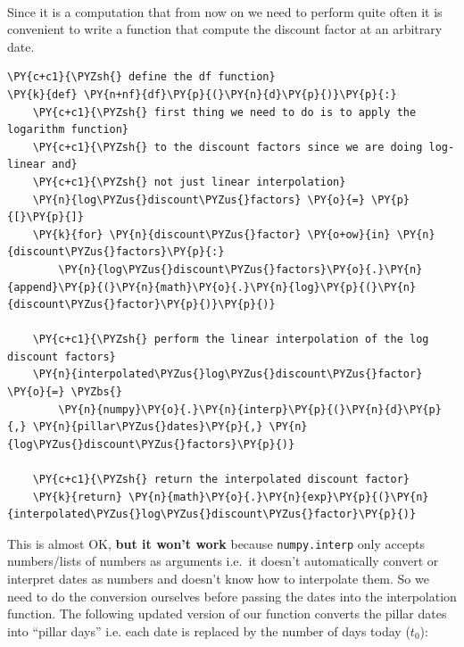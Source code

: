 \begin{center}
\end{center}
{ \hspace*{\fill} \\}
    
Since it is a computation that from now on we need to perform quite often it is convenient to write a function that compute the discount factor at an arbitrary date.

\begin{tcolorbox}[breakable, size=fbox, boxrule=1pt, pad at break*=1mm,colback=cellbackground, colframe=cellborder]
\begin{Verbatim}[commandchars=\\\{\}]
\PY{c+c1}{\PYZsh{} define the df function}
\PY{k}{def} \PY{n+nf}{df}\PY{p}{(}\PY{n}{d}\PY{p}{)}\PY{p}{:}
    \PY{c+c1}{\PYZsh{} first thing we need to do is to apply the logarithm function}
    \PY{c+c1}{\PYZsh{} to the discount factors since we are doing log-linear and}
    \PY{c+c1}{\PYZsh{} not just linear interpolation}
    \PY{n}{log\PYZus{}discount\PYZus{}factors} \PY{o}{=} \PY{p}{[}\PY{p}{]}
    \PY{k}{for} \PY{n}{discount\PYZus{}factor} \PY{o+ow}{in} \PY{n}{discount\PYZus{}factors}\PY{p}{:}
        \PY{n}{log\PYZus{}discount\PYZus{}factors}\PY{o}{.}\PY{n}{append}\PY{p}{(}\PY{n}{math}\PY{o}{.}\PY{n}{log}\PY{p}{(}\PY{n}{discount\PYZus{}factor}\PY{p}{)}\PY{p}{)}
    
    \PY{c+c1}{\PYZsh{} perform the linear interpolation of the log discount factors}
    \PY{n}{interpolated\PYZus{}log\PYZus{}discount\PYZus{}factor} \PY{o}{=} \PYZbs{}
        \PY{n}{numpy}\PY{o}{.}\PY{n}{interp}\PY{p}{(}\PY{n}{d}\PY{p}{,} \PY{n}{pillar\PYZus{}dates}\PY{p}{,} \PY{n}{log\PYZus{}discount\PYZus{}factors}\PY{p}{)}
    
    \PY{c+c1}{\PYZsh{} return the interpolated discount factor}
    \PY{k}{return} \PY{n}{math}\PY{o}{.}\PY{n}{exp}\PY{p}{(}\PY{n}{interpolated\PYZus{}log\PYZus{}discount\PYZus{}factor}\PY{p}{)}
\end{Verbatim}
\end{tcolorbox}

This is almost OK, \textbf{but it won't work} because \texttt{numpy.interp} only accepts numbers/lists of numbers as arguments i.e.~it doesn't automatically convert or interpret dates as numbers and doesn't know how to interpolate them. So we need to do the conversion ourselves before passing the dates into the interpolation function.
The following updated version of our function converts the pillar dates into ``pillar days'' i.e. each date is replaced by the number of days today ($t_0$):

